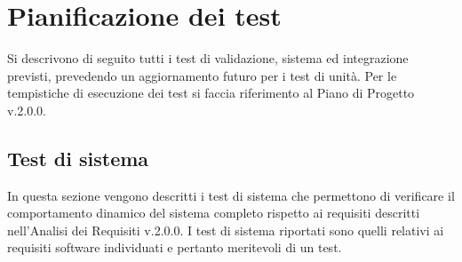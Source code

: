 \section{Pianificazione dei test}{
Si descrivono di seguito tutti i test di validazione, sistema ed integrazione previsti,
prevedendo un aggiornamento futuro per i test di unità. Per le tempistiche di esecuzione
dei test si faccia riferimento al Piano di Progetto v.2.0.0.
\subsection{Test di sistema}{
	In questa sezione vengono descritti i test di sistema che permettono di verificare il
	comportamento dinamico del sistema completo rispetto ai requisiti descritti nell’Analisi
	dei Requisiti v.2.0.0.
	I test di sistema riportati sono quelli relativi ai requisiti software individuati e pertanto
	meritevoli di un test.
	
}}
